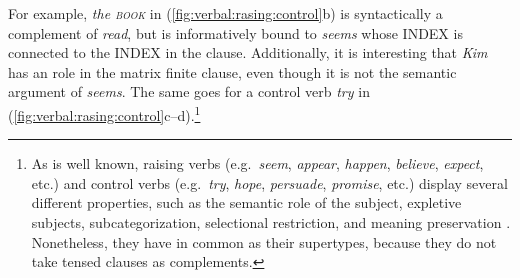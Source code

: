 

\noindent For example, \textit{the \textsc{book}} in
(\ref{fig:verbal:rasing:control}b) is syntactically a complement of
\textit{read}, but is informatively bound to \textit{seems} whose
INDEX is connected to the INDEX in the clause.  Additionally, it is
interesting that \textit{Kim} has an  role in the matrix
finite clause, even though it is not the
semantic argument of \textit{seems}. The same goes for a control verb
\textit{try} in (\ref{fig:verbal:rasing:control}c--d).\footnote{As is
  well known, raising verbs (e.g.\ \textit{seem}, \textit{appear},
  \textit{happen}, \textit{believe}, \textit{expect}, etc.) and
  control verbs (e.g.\ \textit{try}, \textit{hope}, \textit{persuade},
  \textit{promise}, etc.) display several different properties, such
  as the semantic role of the subject, expletive subjects,
  subcategorization, selectional restriction, and meaning preservation
  \citep{kim:sells:08}. Nonetheless, they have
   in common as their supertypes, because
  they do not take tensed clauses as complements.}




